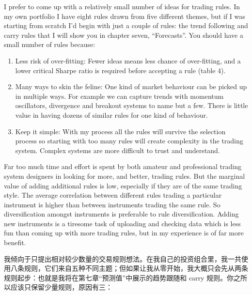 
\begin{englishblock} I prefer to come up with a relatively small number of ideas for trading rules. In my own portfolio I have eight rules drawn from five different themes, but if I was starting from scratch I'd begin with just a couple of rules: the trend following and carry rules that I will show you in chapter seven, ``Forecasts''. You should have a small number of rules because: \end{englishblock}

\begin{enumerate}
\item Less risk of over-fitting: Fewer ideas means less chance of over-fitting, and a lower critical Sharpe ratio is required before accepting a rule (table 4).
\item Many ways to skin the feline: One kind of market behaviour can be picked up in multiple ways. For example we can capture trends with momentum oscillators, divergence and breakout systems to name but a few. There is little value in having dozens of similar rules for one kind of behaviour.
\item Keep it simple: With my process all the rules will survive the selection process so starting with too many rules will create complexity in the trading system. Complex systems are more difficult to trust and understand. \end{enumerate}
Far too much time and effort is spent by both amateur and professional trading system designers in looking for more, and better, trading rules. But the marginal value of adding additional rules is low, especially if they are of the same trading style. The average correlation between different rules trading a particular instrument is higher than between instruments trading the same rule. So diversification amongst instruments is preferable to rule diversification. Adding new instruments is a tiresome task of uploading and checking data which is less fun than coming up with more trading rules, but in my experience is of far more benefit.

\begin{chineseblock}我倾向于只提出相对较少数量的交易规则想法。在我自己的投资组合里，我一共使用八条规则，它们来自五种不同主题；但如果让我从零开始，我大概只会先从两条规则起步：也就是我将在第七章“预测值”中展示的趋势跟随和 carry 规则。你之所以应该只保留少量规则，原因有三：\end{chineseblock}


